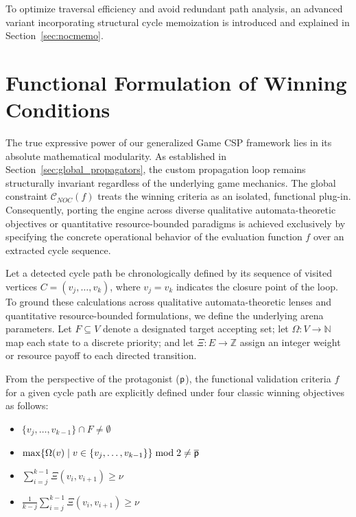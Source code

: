 \documentclass[a4paper,fleqn]{cas-sc}
\begin{document}
To optimize traversal efficiency and avoid redundant path analysis, an advanced variant incorporating structural cycle memoization is introduced and explained in Section~\ref{sec:nocmemo}.


\section{Functional Formulation of Winning Conditions}\label{sec:function_conditions}

The true expressive power of our generalized Game CSP framework lies in its absolute mathematical modularity. As established in Section~\ref{sec:global_propagators}, the custom propagation loop remains structurally invariant regardless of the underlying game mechanics. The global constraint $\mathcal{C}_{\!N\!O\!C}(f)$ treats the winning criteria as an isolated, functional plug-in. Consequently, porting the engine across diverse qualitative automata-theoretic objectives or quantitative resource-bounded paradigms is achieved exclusively by specifying the concrete operational behavior of the evaluation function $f$ over an extracted cycle sequence.

Let a detected cycle path be chronologically defined by its sequence of visited vertices $C = (v_j, \dots, v_k)$, where $v_j = v_k$ indicates the closure point of the loop. To ground these calculations across qualitative automata-theoretic lenses and quantitative resource-bounded formulations, we define the underlying arena parameters. Let $F \subseteq V$ denote a designated target accepting set; let $\Omega: V \rightarrow \mathbb{N}$ map each state to a discrete priority; and let $\Xi: E \rightarrow \mathbb{Z}$ assign an integer weight or resource payoff to each directed transition. 

From the perspective of the protagonist ($\mathsf{p}$), the functional validation criteria $f$ for a given cycle path are explicitly defined under four classic winning objectives as follows:

\begin{itemize}[leftmargin=3.1cm, labelwidth=2.8cm, align=right, itemsep=0.8ex, parsep=0pt, topsep=4pt]
    \item [$f^{\mathcal{\varphi}}(v_j, \dots, v_k) =$] $\{v_j, \dots, v_{k-1}\} \cap F \neq \emptyset$
    \item [$f^{\omega}(v_j, \dots, v_k) =$] $\max\{\Omega(v) \mid v \in \{v_j, \dots, v_{k-1}\}\} \bmod 2 \neq \overline{\mathsf{p}}$
    \item [$f^{\eta}(v_j, \dots, v_k) =$] $\sum_{i=j}^{k-1} \Xi(v_i, v_{i+1}) \geq \nu$
    \item [$f^{\mu}(v_j, \dots, v_k) =$] $\frac{1}{k-j} \sum_{i=j}^{k-1} \Xi(v_i, v_{i+1}) \geq \nu$
\end{itemize}
\end{document}
